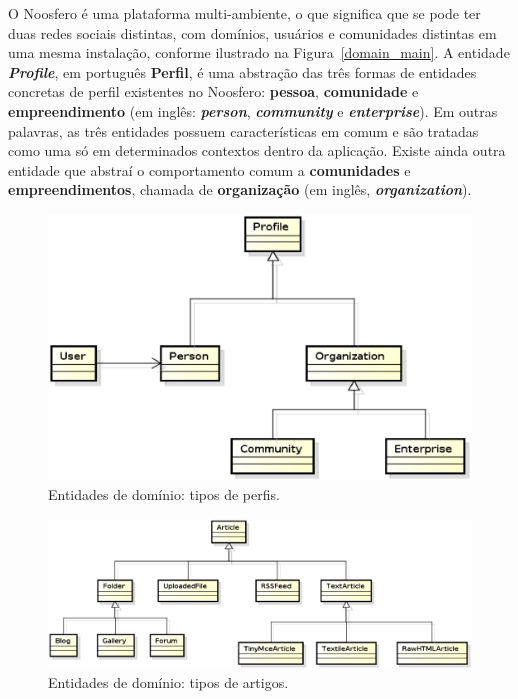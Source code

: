 O Noosfero é uma plataforma multi-ambiente, o que significa que se pode ter duas
redes sociais distintas, com domínios, usuários e comunidades distintas em uma
mesma instalação, conforme ilustrado na Figura~\ref{domain_main}.
%
A entidade \textbf{\textit{Profile}}, em português \textbf{Perfil}, é uma
abstração das três formas de entidades concretas de perfil existentes no
Noosfero: \textbf{pessoa}, \textbf{comunidade} e \textbf{empreendimento}
(em inglês: \textbf{\textit{person}}, \textbf{\textit{community}} e
\textbf{\textit{enterprise}}).
%
Em outras palavras, as três entidades possuem características em comum e são tratadas
como uma só em determinados contextos dentro da aplicação. Existe ainda
outra entidade que abstraí o comportamento comum a \textbf{comunidades}
e \textbf{empreendimentos}, chamada de \textbf{organização} (em inglês,
\textbf{\textit{organization}}).

\begin{figure}[h!]
    \centering
    \includegraphics[keepaspectratio=true,scale=0.6]
      {figuras/domain_profiles.eps}
    \caption{Entidades de domínio: tipos de perfis.}
    \label{domain_profiles}
\end{figure}

\begin{figure}[h!]
    \centering
    \includegraphics[keepaspectratio=true,scale=0.55]
      {figuras/domain_articles.eps}
    \caption{Entidades de domínio: tipos de artigos.}
    \label{domain_articles}
\end{figure}

